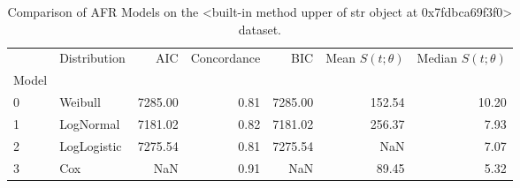 \begin{table}
\caption{Comparison of AFR Models on the <built-in method upper of str object at 0x7fdbca69f3f0> dataset.}
\label{tab:mnist}
\begin{tabular}{llrrrrr}
\toprule
 & Distribution & AIC & Concordance & BIC & Mean $S(t;\theta)$ & Median $S(t;\theta)$ \\
Model &  &  &  &  &  &  \\
\midrule
0 & Weibull & 7285.00 & 0.81 & 7285.00 & 152.54 & 10.20 \\
1 & LogNormal & 7181.02 & 0.82 & 7181.02 & 256.37 & 7.93 \\
2 & LogLogistic & 7275.54 & 0.81 & 7275.54 & NaN & 7.07 \\
3 & Cox & NaN & 0.91 & NaN & 89.45 & 5.32 \\
\bottomrule
\end{tabular}
\end{table}
